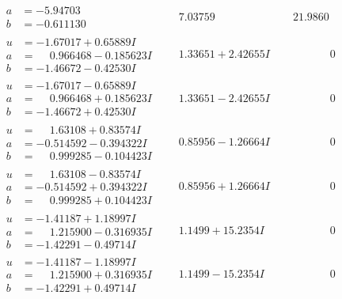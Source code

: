 \documentclass[1p]{elsarticle_modified}
\theoremstyle{definition}
\begin{document}
$$\begin{array}{c|c|c}
\begin{aligned}
a &= -5.94703\phantom{ +0.000000I} \\
b &= -0.611130\phantom{ +0.000000I}\end{aligned}
 & \phantom{-}7.03759\phantom{ +0.000000I} & \phantom{-}21.9860\phantom{ +0.000000I} \\ \hline\begin{aligned}
u &= -1.67017 + 0.65889 I \\
a &= \phantom{-}0.966468 - 0.185623 I \\
b &= -1.46672 - 0.42530 I\end{aligned}
 & \phantom{-}1.33651 + 2.42655 I & \phantom{-0.000000 } 0 \\ \hline\begin{aligned}
u &= -1.67017 - 0.65889 I \\
a &= \phantom{-}0.966468 + 0.185623 I \\
b &= -1.46672 + 0.42530 I\end{aligned}
 & \phantom{-}1.33651 - 2.42655 I & \phantom{-0.000000 } 0 \\ \hline\begin{aligned}
u &= \phantom{-}1.63108 + 0.83574 I \\
a &= -0.514592 - 0.394322 I \\
b &= \phantom{-}0.999285 - 0.104423 I\end{aligned}
 & \phantom{-}0.85956 - 1.26664 I & \phantom{-0.000000 } 0 \\ \hline\begin{aligned}
u &= \phantom{-}1.63108 - 0.83574 I \\
a &= -0.514592 + 0.394322 I \\
b &= \phantom{-}0.999285 + 0.104423 I\end{aligned}
 & \phantom{-}0.85956 + 1.26664 I & \phantom{-0.000000 } 0 \\ \hline\begin{aligned}
u &= -1.41187 + 1.18997 I \\
a &= \phantom{-}1.215900 - 0.316935 I \\
b &= -1.42291 - 0.49714 I\end{aligned}
 & \phantom{-}1.1499 + 15.2354 I & \phantom{-0.000000 } 0 \\ \hline\begin{aligned}
u &= -1.41187 - 1.18997 I \\
a &= \phantom{-}1.215900 + 0.316935 I \\
b &= -1.42291 + 0.49714 I\end{aligned}
 & \phantom{-}1.1499 - 15.2354 I & \phantom{-0.000000 } 0 \\ \hline\begin{aligned}

\end{aligned}
\end{array}$$
\end{document}
